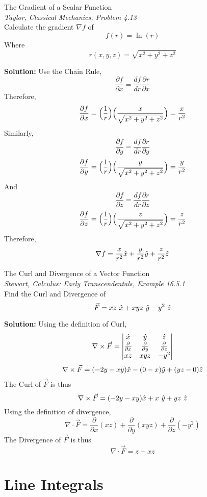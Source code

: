 \documentclass[11pt]{article}
\theoremstyle{gangnamstyle}{\newtheorem{definition}{Definition}[]}
\theoremstyle{gangnamstyle}{\newtheorem{example}{Example}[]}
\theoremstyle{gangnamstyle}{\newtheorem{problem}{Problem}[]}
\begin{document}
\begin{example}
The Gradient of a Scalar Function \\
\textit{Taylor, Classical Mechanics, Problem 4.13} \\
Calculate the gradient $\nabla f$ of
\[ f(r) = \ln(r) \]
Where
\[ r(x, y, z) = \sqrt{x^2 + y^2 + z^2} \]

\textbf{Solution:} Use the Chain Rule, 
\[ \frac{\partial f}{\partial x} = \frac{df}{dr}\frac{\partial r}{\partial x} \]
Therefore, 
\[ \frac{\partial f}{\partial x} = \Bigl(\frac{1}{r}\Bigr)\Bigl(\frac{x}{\sqrt{x^2 + y^2 + z^2}}\Bigr) = \frac{x}{r^2} \]
Similarly,
\[ \frac{\partial f}{\partial y} = \frac{df}{dr}\frac{\partial r}{\partial y} \]
\[ \frac{\partial f}{\partial y} = \Bigl(\frac{1}{r}\Bigr)\Bigl(\frac{y}{\sqrt{x^2 + y^2 + z^2}}\Bigr) = \frac{y}{r^2} \]
And
\[ \frac{\partial f}{\partial z} = \frac{df}{dr}\frac{\partial r}{\partial z} \]
\[ \frac{\partial f}{\partial z} = \Bigl(\frac{1}{r}\Bigr)\Bigl(\frac{z}{\sqrt{x^2 + y^2 + z^2}}\Bigr) = \frac{z}{r^2} \]
Therefore, 
\[ \nabla f = \frac{x}{r^2}\Hat{x} + \frac{y}{r^2}\Hat{y} + \frac{z}{r^2}\Hat{z} \]
\end{example}

\begin{example}
The Curl and Divergence of a Vector Function \\
\textit{Stewart, Calculus: Early Transcendentals, Example 16.5.1} \\
Find the Curl and Divergence of
\[ \Vec{F} = xz \ \Hat{x} + xyz \ \Hat{y} - y^2 \ \Hat{z} \]

\textbf{Solution:} Using the definition of Curl,
\[ \nabla \times \Vec{F} = 
\begin{vmatrix}
\Hat{x} & \Hat{y} & \Hat{z} \\
\frac{\partial }{\partial x} & \frac{\partial }{\partial y} & \frac{\partial }{\partial z} \\
xz & xyz & -y^2
\end{vmatrix}
\]
\[ \nabla \times \Vec{F} = (-2y - xy)\Hat{x} - (0 - x)\Hat{y} + (yz - 0)\Hat{z} \]
The Curl of $\Vec{F}$ is thus
\[ \nabla \times \Vec{F} = (-2y - xy)\Hat{x} + x \ \Hat{y} + yz \ \Hat{z} \]
Using the definition of divergence, 
\[ \nabla \cdot \Vec{F} = \frac{\partial}{\partial x}(xz) + \frac{\partial}{\partial y}(xyz) + \frac{\partial}{\partial z}(-y^2) \]
The Divergence of $\Vec{F}$ is thus
\[ \nabla \cdot \Vec{F} = z + xz \]
\end{example}

\section{Line Integrals}
\end{document}

